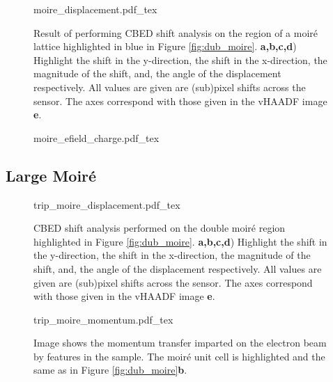 \begin{figure}
    \centering
    \def\svgwidth{.95\linewidth}
    {moire_displacement.pdf_tex}
    \caption{Result of performing CBED shift analysis on the region of a moiré lattice highlighted in blue in Figure \ref{fig:dub_moire}. \textbf{a,b,c,d}) Highlight the shift in the y-direction, the shift in the x-direction, the magnitude of the shift, and, the angle of the displacement respectively. All values are given are (sub)pixel shifts across the sensor. The axes correspond with those given in the vHAADF image \textbf{e}.}
    \label{fig:m_dis}
\end{figure}


\begin{figure}
    \centering
    \def\svgwidth{.5\linewidth}
    {moire_efield_charge.pdf_tex}
    \caption{}
    \label{fig:m_mom}
\end{figure}

\subsection{Large Moiré}

\begin{figure}
    \centering
    \def\svgwidth{.95\linewidth}
    {trip_moire_displacement.pdf_tex}
    \caption{CBED shift analysis performed on the double moiré region highlighted in Figure \ref{fig:dub_moire}. \textbf{a,b,c,d}) Highlight the shift in the y-direction, the shift in the x-direction, the magnitude of the shift, and, the angle of the displacement respectively. All values are given are (sub)pixel shifts across the sensor. The axes correspond with those given in the vHAADF image \textbf{e}.}
    \label{fig:trip_m_dis}
\end{figure}

\begin{figure}
    \centering
    \def\svgwidth{.7\linewidth}
    {trip_moire_momentum.pdf_tex}
    \caption{Image shows the momentum transfer imparted on the electron beam by features in the sample. The moiré unit cell is highlighted and the same as in Figure \ref{fig:dub_moire}\textbf{b}.}
    \label{fig:trip_m_mom}
\end{figure}

